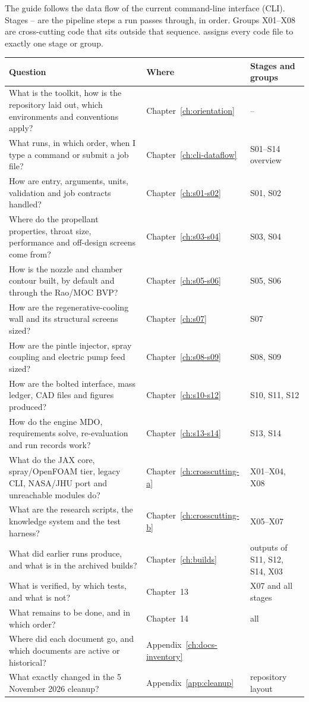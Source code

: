 The guide follows the data flow of the current command-line interface (CLI). Stages -- are the pipeline steps a run passes through, in order. Groups X01--X08 are cross-cutting code that sits outside that sequence.  assigns every code file to exactly one stage or group.

{\small
\begin{longtable}{P{7.6cm}P{3.2cm}P{4.4cm}}
\toprule
Question & Where & Stages and groups \\
\midrule
\endhead
What is the toolkit, how is the repository laid out, which environments and conventions apply? & Chapter~\ref{ch:orientation} & -- \\
What runs, in which order, when I type a command or submit a job file? & Chapter~\ref{ch:cli-dataflow} & S01--S14 overview \\
How are entry, arguments, units, validation and job contracts handled? & Chapter~\ref{ch:s01-s02} & S01, S02 \\
Where do the propellant properties, throat size, performance and off-design screens come from? & Chapter~\ref{ch:s03-s04} & S03, S04 \\
How is the nozzle and chamber contour built, by default and through the Rao/MOC BVP? & Chapter~\ref{ch:s05-s06} & S05, S06 \\
How are the regenerative-cooling wall and its structural screens sized? & Chapter~\ref{ch:s07} & S07 \\
How are the pintle injector, spray coupling and electric pump feed sized? & Chapter~\ref{ch:s08-s09} & S08, S09 \\
How are the bolted interface, mass ledger, CAD files and figures produced? & Chapter~\ref{ch:s10-s12} & S10, S11, S12 \\
How do the engine MDO, requirements solve, re-evaluation and run records work? & Chapter~\ref{ch:s13-s14} & S13, S14 \\
What do the JAX core, spray/OpenFOAM tier, legacy CLI, NASA/JHU port and unreachable modules do? & Chapter~\ref{ch:crosscutting-a} & X01--X04, X08 \\
What are the research scripts, the knowledge system and the test harness? & Chapter~\ref{ch:crosscutting-b} & X05--X07 \\
What did earlier runs produce, and what is in the archived builds? & Chapter~\ref{ch:builds} & outputs of S11, S12, S14, X03 \\
What is verified, by which tests, and what is not? & Chapter~13 & X07 and all stages \\
What remains to be done, and in which order? & Chapter~14 & all \\
Where did each document go, and which documents are active or historical? & Appendix~\ref{ch:docs-inventory} &  \\
What exactly changed in the 5 November 2026 cleanup? & Appendix~\ref{app:cleanup} & repository layout \\
\bottomrule
\end{longtable}}

